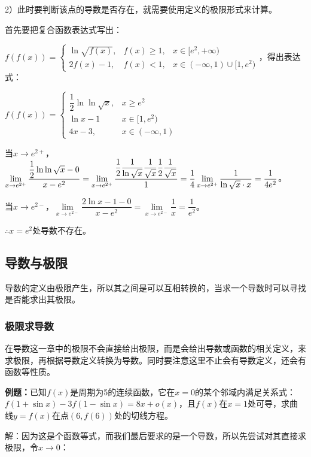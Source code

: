 \documentclass[UTF8, 12pt]{ctexart}
\begin{document}
2）此时要判断该点的导数是否存在，就需要使用定义的极限形式来计算。

首先要把复合函数表达式写出：\medskip

$f(f(x))=\left\{\begin{array}{lll}
    \ln\sqrt{f(x)}, & f(x)\geqslant1, & x\in[e^2,+\infty) \\
    2f(x)-1, & f(x)<1, & x\in(-\infty,1)\cup[1,e^2)
\end{array}\right.$，得出表达式：

$f(f(x))=\left\{\begin{array}{ll}
    \dfrac{1}{2}\ln\ln\sqrt{x}, & x\geqslant e^2  \\
    \ln x-1 & x\in[1,e^2) \\
    4x-3, & x\in(-\infty,1)
\end{array}\right.$

当$x\to e^{2+}$，$\lim\limits_{x\to e^{2+}}\dfrac{\dfrac{1}{2}\ln\ln\sqrt{x}-0}{x-e^2}=\lim\limits_{x\to e^{2+}}\dfrac{\dfrac{1}{2}\dfrac{1}{\ln\sqrt{x}}\dfrac{1}{\sqrt{x}}\dfrac{1}{2}\dfrac{1}{\sqrt{x}}}{1}=\\\dfrac{1}{4}\lim\limits_{x\to e^{2+}}\dfrac{1}{\ln\sqrt{x}\cdot x}=\dfrac{1}{4e^2}$。

当$x\to e^{2-}$，$\lim\limits_{x\to e^{2-}}\dfrac{2\ln x-1-0}{x-e^2}=\lim\limits_{x\to e^{2-}}\dfrac{1}{x}=\dfrac{1}{e^2}$。

$\therefore x=e^2$处导数不存在。

\subsection{导数与极限}

导数的定义由极限产生，所以其之间是可以互相转换的，当求一个导数时可以寻找是否能求出其极限。

\subsubsection{极限求导数}

在导数这一章中的极限不会直接给出极限，而是会给出导数或函数的相关定义，来求极限，再根据导数定义转换为导数。同时要注意这里不止会有导数定义，还会有函数等性质。

\textbf{例题：}已知$f(x)$是周期为5的连续函数，它在$x=0$的某个邻域内满足关系式：$f(1+\sin x)-3f(1-\sin x)= 8x+o(x)$，且$f(x)$在$x=1$处可导，求曲线$y=f(x)$在点$(6,f(6))$处的切线方程。

解：因为这是个函数等式，而我们最后要求的是一个导数，所以先尝试对其直接求极限，令$x\to0$：
\end{document}
